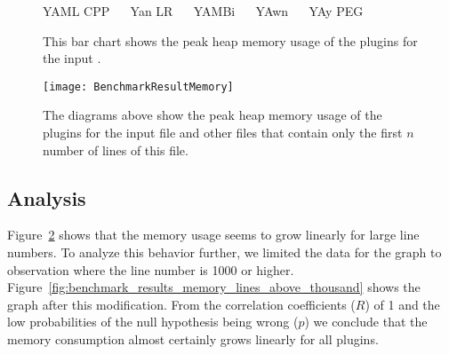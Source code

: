 \begin{figure}[H]
  \begin{bchart}[max=700, width=0.8\textwidth, unit=MB]




  \end{bchart}
  \begin{center}
  \vspace{-0.5cm}
     YAML CPP ~~
     Yan LR ~~
     YAMBi ~~
     YAwn ~~
     YAy PEG
  \vspace{-0.5cm}
  \end{center}
  \caption{This bar chart shows the peak heap memory usage of the plugins for the input \FileGenerated{}.}
  \label{fig:benchmark_memory_generated}
\end{figure}

\begin{figure}[H]
  \centering
    \texttt{[image: BenchmarkResultMemory]}
  \caption{The diagrams above show the peak heap memory usage of the plugins for the input file \FileGeneratedHundredThousand{} and other files that contain only the first $n$ number of lines of this file.}
  \label{fig:benchmark_results_memory_lines}
\end{figure}

\subsection{Analysis}

Figure~\ref{fig:benchmark_results_memory_lines} shows that the memory usage seems to grow linearly for large line numbers. To analyze this behavior further, we limited the data for the graph to observation where the line number is 1000 or higher. Figure~\ref{fig:benchmark_results_memory_lines_above_thousand} shows the graph after this modification. From the correlation coefficients ($R$) of 1 and the low probabilities of the null hypothesis being wrong ($p$) we conclude that the memory consumption almost certainly grows linearly for all plugins.

